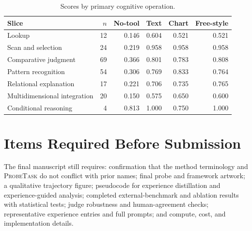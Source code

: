 \documentclass{article}
\newcommand{\probe}{\textsc{ProbeTask}}
\begin{document}
\begin{table}[h]
  \caption{Scores by primary cognitive operation.}
  \label{tab:cognitive-slices}
  \centering
  \scriptsize
  \setlength{\tabcolsep}{3.5pt}
  \begin{tabular}{lrrrrr}
    \toprule
    Slice & $n$ & No-tool & Text & Chart & Free-style \\
    \midrule
    Lookup                    & 12 & 0.146 & 0.604 & 0.521 & 0.521 \\
    Scan and selection        & 24 & 0.219 & 0.958 & 0.958 & 0.958 \\
    Comparative judgment      & 69 & 0.366 & 0.801 & 0.783 & 0.808 \\
    Pattern recognition       & 54 & 0.306 & 0.769 & 0.833 & 0.764 \\
    Relational explanation    & 17 & 0.221 & 0.706 & 0.735 & 0.765 \\
    Multidimensional integration & 20 & 0.150 & 0.575 & 0.650 & 0.600 \\
    Conditional reasoning     &  4 & 0.813 & 1.000 & 0.750 & 1.000 \\
    \bottomrule
  \end{tabular}
\end{table}

\section{Items Required Before Submission}
\label{app:pending}

The final manuscript still requires: confirmation that the method terminology and \probe{} do not conflict with prior names; final probe and framework artwork; a qualitative trajectory figure; pseudocode for experience distillation and experience-guided analysis; completed external-benchmark and ablation results with statistical tests; judge robustness and human-agreement checks; representative experience entries and full prompts; and compute, cost, and implementation details.
\end{document}
